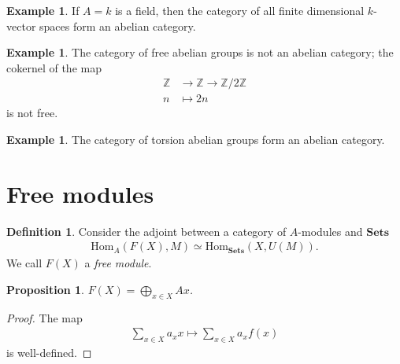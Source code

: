 \documentclass[12pt]{report}
\theoremstyle{plain}
\newtheorem{proposition}[theorem]{Proposition}
\theoremstyle{remark}
\theoremstyle{definition}
\newtheorem{definition}[theorem]{Definition}
\newtheorem{example}[theorem]{Example}
\newcommand{\Z}{\mathbb{Z}}
\newcommand{\Hom}[3]{\mathrm{Hom}_{#3}(#1,#2)}
\begin{document}
\begin{example}
    If $A=k$ is a field, then the category of all finite dimensional $k$-vector spaces form an abelian category.
\end{example}

\begin{example}
    The category of free abelian groups is not an abelian category; the cokernel of the map
    \begin{align*}
        \Z &\rightarrow \Z \rightarrow \Z/2\Z \\
        n &\mapsto 2n
    \end{align*}
    is not free.
\end{example}

\begin{example}
    The category of torsion abelian groups form an abelian category.
\end{example}





\clearpage
\section{Free modules}
\begin{definition}
    Consider the adjoint between a category of $A$-modules and $\mathbf{Sets}$
    \begin{align*}
        \Hom{F(X)}{M}{A}\simeq \Hom{X}{U(M)}{\mathbf{Sets}}.
    \end{align*}
    We call $F(X)$ a \emph{free module}.
\end{definition}

\begin{proposition}
    $F(X)=\bigoplus_{x\in X} Ax$.
\end{proposition}
\begin{proof}
    The map
    \begin{align*}
        \sum_{x\in X}a_x x\mapsto \sum_{x\in X} a_x f(x)
    \end{align*}
    is well-defined.
\end{proof}
\end{document}
